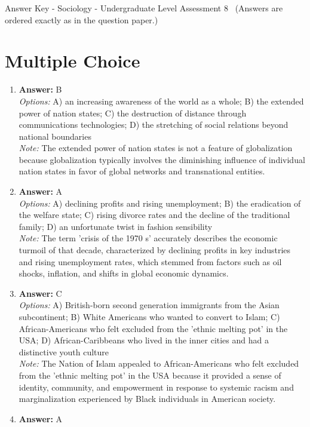 \documentclass[12pt]{article}
\begin{document}
\begin{center}
Answer Key - Sociology - Undergraduate Level Assessment 8 \
\small (Answers are ordered exactly as in the question paper.)
\end{center}

\section*{Multiple Choice}
\begin{enumerate}[label=\arabic*.]
\item \textbf{Answer:} B
\\ \textit{Options:} A) an increasing awareness of the world as a whole; B) the extended power of nation states; C) the destruction of distance through communications technologies; D) the stretching of social relations beyond national boundaries
\\ \textit{Note:} The extended power of nation states is not a feature of globalization because globalization typically involves the diminishing influence of individual nation states in favor of global networks and transnational entities.
\item \textbf{Answer:} A
\\ \textit{Options:} A) declining profits and rising unemployment; B) the eradication of the welfare state; C) rising divorce rates and the decline of the traditional family; D) an unfortunate twist in fashion sensibility
\\ \textit{Note:} The term 'crisis of the 1970 s' accurately describes the economic turmoil of that decade, characterized by declining profits in key industries and rising unemployment rates, which stemmed from factors such as oil shocks, inflation, and shifts in global economic dynamics.
\item \textbf{Answer:} C
\\ \textit{Options:} A) British-born second generation immigrants from the Asian subcontinent; B) White Americans who wanted to convert to Islam; C) African-Americans who felt excluded from the 'ethnic melting pot' in the USA; D) African-Caribbeans who lived in the inner cities and had a distinctive youth culture
\\ \textit{Note:} The Nation of Islam appealed to African-Americans who felt excluded from the 'ethnic melting pot' in the USA because it provided a sense of identity, community, and empowerment in response to systemic racism and marginalization experienced by Black individuals in American society.
\item \textbf{Answer:} A

\end{enumerate}
\end{document}
